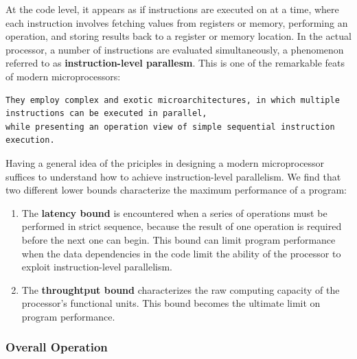 \documentclass[11pt]{article}
\begin{document}
At the code level, it appears as if instructions are executed on at a time, where each instruction involves fetching values from registers or memory, performing an operation, and storing results back to a register or memory location. In the actual processor, a number of instructions are evaluated simultaneously, a phenomenon referred to as \textbf{instruction-level parallesm}. This is one of the remarkable feats of modern microprocessors:\\
\begin{verbatim}
They employ complex and exotic microarchitectures, in which multiple instructions can be executed in parallel, 
while presenting an operation view of simple sequential instruction execution.
\end{verbatim}

Having a general idea of the priciples in designing a modern microprocessor suffices to understand how to achieve instruction-level parallelism. We find that two different lower bounds characterize the maximum performance of a program:\\
\begin{enumerate}
\item The \textbf{latency bound} is encountered when a series of operations must be performed in strict sequence, because the result of one operation is required before the next one can begin. This bound can limit program performance when the data dependencies in the code limit the ability of the processor to exploit instruction-level parallelism.\\
\item The \textbf{throughtput bound} characterizes the raw computing capacity of the processor's functional units. This bound becomes the ultimate limit on program performance.\\
\end{enumerate}


\subsubsection{Overall Operation}
\label{sec:org99a874f}
\end{document}
